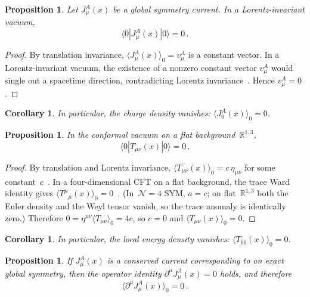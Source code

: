 \documentclass[
  aps,
  prd,
  preprint,
  groupedaddress,
  nofootinbib,
  longbibliography
]{revtex4-2}
\newtheorem{proposition}[definition]{Proposition}
\newtheorem{corollary}[definition]{Corollary}
\theoremstyle{remark}
\newcommand{\N}{\mathcal{N}}
\begin{document}
\begin{proposition}\label{prop:current-vanish}
Let $J_\mu^A(x)$ be a global symmetry current.
In a Lorentz-invariant vacuum,
\begin{equation}\label{eq:current-vanish}
  \langle 0|J_\mu^A(x)|0\rangle = 0\,.
\end{equation}
\end{proposition}

\begin{proof}
By translation invariance,
$\langle J_\mu^A(x)\rangle_0 = v_\mu^A$ is a constant vector.
In a Lorentz-invariant vacuum, the existence of a nonzero constant
vector $v_\mu^A$ would single out a spacetime direction,
contradicting Lorentz invariance~\cite{ref13,ref14}.
Hence $v_\mu^A = 0$.
\end{proof}

\begin{corollary}\label{cor:charge-vanish}
In particular, the charge density vanishes:
$\langle J_0^A(x)\rangle_0 = 0$.
\end{corollary}

\begin{proposition}\label{prop:Tmunu-vanish}
In the conformal vacuum on a flat background~$\mathbb{R}^{1,3}$,
\begin{equation}\label{eq:Tmunu-vanish}
  \langle 0|T_{\mu\nu}(x)|0\rangle = 0\,.
\end{equation}
\end{proposition}

\begin{proof}
By translation and Lorentz invariance,
$\langle T_{\mu\nu}(x)\rangle_0 = c\,\eta_{\mu\nu}$
for some constant~$c$~\cite{ref13,ref14}.
In a four-dimensional CFT on a flat background,
the trace Ward identity gives
$\langle T^\mu{}_\mu(x)\rangle_0 = 0$~\cite{ref5,ref13,ref14}.
(In~$\N=4$ SYM, $a=c$; on flat~$\mathbb{R}^{1,3}$ both the Euler
density and the Weyl tensor vanish, so the trace anomaly is
identically zero.)
Therefore $0 = \eta^{\mu\nu}\langle T_{\mu\nu}\rangle_0 = 4c$,
so $c=0$ and $\langle T_{\mu\nu}(x)\rangle_0 = 0$.
\end{proof}

\begin{corollary}\label{cor:T00-vanish}
In particular, the local energy density vanishes:
$\langle T_{00}(x)\rangle_0 = 0$.
\end{corollary}

\begin{proposition}\label{prop:divJ-vanish}
If $J_\mu^A(x)$ is a conserved current corresponding to an exact
global symmetry, then the operator identity
$\partial^\mu J_\mu^A(x) = 0$ holds, and therefore
\begin{equation}\label{eq:divJ-vanish}
  \langle\partial^\mu J_\mu^A(x)\rangle_0 = 0\,.
\end{equation}
\end{proposition}
\end{document}
